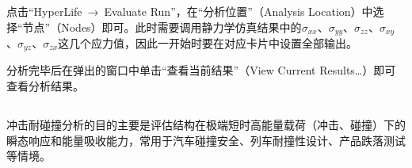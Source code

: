 \documentclass[12pt, oneside, a4paper]{ctexart}
\begin{document}
\subsubsection{}
\par{}
点击“HyperLife~→~Evaluate Run”，在“分析位置”（Analysis Location）中选择“节点”（Nodes）即可。此时需要调用静力学仿真结果中的$\sigma_{xx}$、$\sigma_{yy}$、$\sigma_{zz}$、$\sigma_{xy}$、$\sigma_{yz}$、$\sigma_{zx}$这几个应力值，因此一开始时要在对应卡片中设置全部输出。
\par{}
分析完毕后在弹出的窗口中单击“查看当前结果”（View Current Results\dots）即可查看分析结果。
\subsection{}
\par{}
冲击耐碰撞分析的目的主要是评估结构在极端短时高能量载荷（冲击、碰撞）下的瞬态响应和能量吸收能力，常用于汽车碰撞安全、列车耐撞性设计、产品跌落测试等情境。
\end{document}
